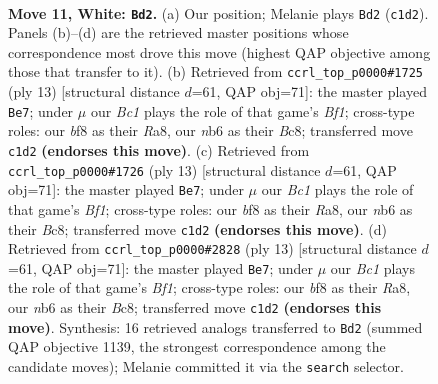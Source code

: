 \documentclass[11pt]{article}
\begin{document}
\clearpage

\begin{figure}[p]\centering
\begin{subfigure}{0.46\textwidth}\centering
\resizebox{\linewidth}{!}{%
\newchessgame
\chessboard[
  setfen={r1bqkb1r/1pp5/1nn3p1/p3pp1p/7P/2NP1NP1/PP2PPB1/R1BQ1R1K w kq - 0 11},
  showmover=false,
  pgfstyle=straightmove, color=movearrow, markmove={c1-d2}
]}
\caption{}
\end{subfigure}\hfill
\begin{subfigure}{0.46\textwidth}\centering
\resizebox{\linewidth}{!}{%
\newchessgame
\chessboard[
  setfen={r1bqkb1r/pp3ppp/2np1n2/4p3/4P3/1NN2P2/PPP3PP/R1BQKB1R b KQkq - 1 7},
  showmover=false,
  pgfstyle=straightmove, color=movearrow, markmove={f8-e7}
]}
\caption{}
\end{subfigure}
\\[4pt]
\begin{subfigure}{0.46\textwidth}\centering
\resizebox{\linewidth}{!}{%
\newchessgame
\chessboard[
  setfen={r1bqkb1r/pp3ppp/2np1n2/4p3/4P3/1NN2P2/PPP3PP/R1BQKB1R b KQkq - 1 7},
  showmover=false,
  pgfstyle=straightmove, color=movearrow, markmove={f8-e7}
]}
\caption{}
\end{subfigure}\hfill
\begin{subfigure}{0.46\textwidth}\centering
\resizebox{\linewidth}{!}{%
\newchessgame
\chessboard[
  setfen={r1bqkb1r/pp3ppp/2np1n2/4p3/4P3/1NN2P2/PPP3PP/R1BQKB1R b KQkq - 1 7},
  showmover=false,
  pgfstyle=straightmove, color=movearrow, markmove={f8-e7}
]}
\caption{}
\end{subfigure}
\caption{\textbf{Move 11, White: \texttt{Bd2}.} (a) Our position; Melanie plays \texttt{Bd2} (\texttt{c1d2}). Panels (b)--(d) are the retrieved master positions whose correspondence most drove this move (highest QAP objective among those that transfer to it). (b) Retrieved from \texttt{ccrl\_top\_p0000\#1725} (ply 13) [structural distance $d$=61, QAP obj=71]: the master played \texttt{Be7}; under $\mu$ our \emph{Bc1} plays the role of that game's \emph{Bf1}; cross-type roles: our \emph{b}f8 as their \emph{R}a8, our \emph{n}b6 as their \emph{B}c8; transferred move \texttt{c1d2} \textbf{(endorses this move)}. (c) Retrieved from \texttt{ccrl\_top\_p0000\#1726} (ply 13) [structural distance $d$=61, QAP obj=71]: the master played \texttt{Be7}; under $\mu$ our \emph{Bc1} plays the role of that game's \emph{Bf1}; cross-type roles: our \emph{b}f8 as their \emph{R}a8, our \emph{n}b6 as their \emph{B}c8; transferred move \texttt{c1d2} \textbf{(endorses this move)}. (d) Retrieved from \texttt{ccrl\_top\_p0000\#2828} (ply 13) [structural distance $d$=61, QAP obj=71]: the master played \texttt{Be7}; under $\mu$ our \emph{Bc1} plays the role of that game's \emph{Bf1}; cross-type roles: our \emph{b}f8 as their \emph{R}a8, our \emph{n}b6 as their \emph{B}c8; transferred move \texttt{c1d2} \textbf{(endorses this move)}. Synthesis: 16 retrieved analogs transferred to \texttt{Bd2} (summed QAP objective 1139, the strongest correspondence among the candidate moves); Melanie committed it via the \texttt{search} selector.}
\label{fig:thought-m20}
\end{figure}
\end{document}

